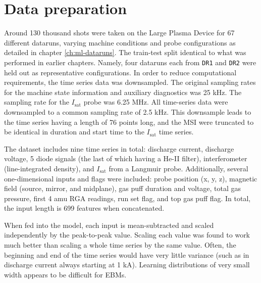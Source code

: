 

\section{Data preparation}

Around 130 thousand shots were taken on the Large Plasma Device for 67 different dataruns, varying machine conditions and probe configurations as detailed in chapter \ref{ch:ml-dataruns}. The train-test split identical to what was performed in earlier chapters. Namely, four dataruns each from \texttt{DR1} and \texttt{DR2} were held out as representative configurations. In order to reduce computational requirements, the time series data was downsampled. The original sampling rates for the machine state information and auxiliary diagnostics was 25 kHz. The sampling rate for the $I_\text{sat}$ probe was 6.25 MHz. All time-series data were downsampled to a common sampling rate of 2.5 kHz. This downsample leads to the time series having a length of 76 points long, and the MSI were truncated to be identical in duration and start time to the $I_\text{sat}$ time series.

The dataset includes nine time series in total: discharge current, discharge voltage, 5 diode signals (the last of which having a He-II filter), interferometer (line-integrated density), and $I_\text{sat}$ from a Langmuir probe. Additionally, several one-dimensional inputs and flags were included: probe position (x, y, z), magnetic field (source, mirror, and midplane), gas puff duration and voltage, total gas pressure, first 4 amu RGA readings, run set flag, and top gas puff flag. In total, the input length is 699 features when concatenated. 

When fed into the model, each input is mean-subtracted and scaled independently by the peak-to-peak value. Scaling each value was found to work much better than scaling a whole time series by the same value. Often, the beginning and end of the time series would have very little variance (such as in discharge current always starting at 1 kA). Learning distributions of very small width  appears to be difficult for EBMs. 


